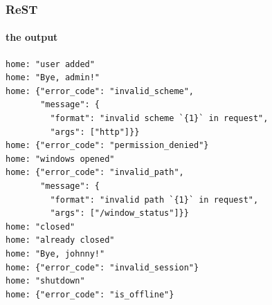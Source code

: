 \documentclass[compress,table,xcolor=table]{beamer}
\begin{document}
\begin{frame}[fragile]
  \frametitle{ReST}
  \framesubtitle{the output}
  \smaller
  \begin{verbatim}
home: "user added"
home: "Bye, admin!"
home: {"error_code": "invalid_scheme",
       "message": {
         "format": "invalid scheme `{1}` in request",
         "args": ["http"]}}
home: {"error_code": "permission_denied"}
home: "windows opened"
home: {"error_code": "invalid_path",
       "message": {
         "format": "invalid path `{1}` in request",
         "args": ["/window_status"]}}
home: "closed"
home: "already closed"
home: "Bye, johnny!"
home: {"error_code": "invalid_session"}
home: "shutdown"
home: {"error_code": "is_offline"}
  \end{verbatim}
\end{frame}
\end{document}
